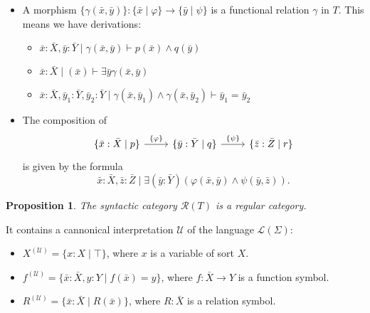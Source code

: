 \documentclass[14pt]{beamer}
\theoremstyle{plain}
\newtheorem{proposition}{Proposition}
\begin{document}
  \begin{frame}[fragile]
    \begin{itemize}
      \item A morphism 
        $\{ \gamma(\bar{x}, \bar{y}) \} : \{\bar{x} \mid \varphi \} \to \{\bar{y} \mid \psi \}$
        is a functional relation $\gamma$ in $T$. \pause 
        This means we have derivations:
        \begin{itemize}
          \item  $\bar{x}:\bar{X},\bar{y}:\bar{Y} \mid \gamma(\bar{x},\bar{y})
            \vdash p(\bar{x}) \wedge q(\bar{y})$
          \item $\bar{x}:\bar{X} \mid (\bar{x}) \vdash \exists \bar{y} \gamma(\bar{x},\bar{y})$
          \item $\bar{x}:\bar{X},\bar{y}_1 : \bar{Y},\bar{y}_2:\bar{Y} \mid
            \gamma(\bar{x},\bar{y}_1) \wedge \gamma(\bar{x},\bar{y}_2) \vdash \bar{y}_1 = \bar{y}_2$
        \end{itemize}
      \pause
      \item The composition of
        \begin{equation*}
          \begin{tikzcd}
            \lbrace \bar{x} : \bar{X} \mid p \rbrace \ar[r, "{\lbrace \varphi \rbrace}"] & 
            \lbrace \bar{y}:\bar{Y} \mid q \rbrace \ar[r, "{\lbrace \psi \rbrace}"] & 
            \lbrace \bar{z}:\bar{Z} \mid r \rbrace
          \end{tikzcd}
        \end{equation*}
        is given by the formula
        \[ \bar{x}:\bar{X}, \bar{z}:\bar{Z} \mid \exists (\bar{y}:\bar{Y}) (\varphi(\bar{x},\bar{y}) \wedge
          \psi(\bar{y},\bar{z})).\]
    \end{itemize}
  \end{frame}

  \begin{frame}
    \begin{proposition}
      The syntactic category $\mathcal{R}(T)$ is a regular category.
    \end{proposition}
    \pause
    It contains a cannonical interpretation $\mathcal{U}$ of the language 
    $\mathcal{L}(\Sigma)$:
    \pause
    \begin{itemize}
      \item $X^{(\mathcal{U})} = \{ x : X \mid \top \}$, where $x$ is a variable of sort $X$.
      \pause
      \item $f^{(\mathcal{U})} = \{ \bar{x}:\bar{X}, y : Y \mid f(\bar{x}) = y\}$, where
        $f : \bar{X} \to Y$ is a function symbol.
      \pause
      \item $R^{(\mathcal{U})} = \{ \bar{x} : \bar{X} \mid R(\bar{x})\}$, where
        $R : \bar{X}$ is a relation symbol.
    \end{itemize}
  \end{frame}
\end{document}
